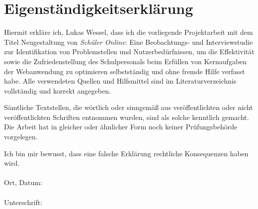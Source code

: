 \newpage
\section{Eigenständigkeitserklärung}
Hiermit erkläre ich, Lukas Wessel, dass ich die vorliegende Projektarbeit mit dem Titel \glqq Neugestaltung von \textit{Schüler Online}: Eine Beobachtungs- und Interviewstudie zur Identifikation von Problemstellen und Nutzerbedürfnissen, um die Effektivität sowie die Zufriedenstellung des Schulpersonals beim Erfüllen von Kernaufgaben der Webanwendung zu optimieren\grqq{} selbstständig und ohne fremde Hilfe verfasst habe. Alle verwendeten Quellen und Hilfsmittel sind im Literaturverzeichnis vollständig und korrekt angegeben.

Sämtliche Textstellen, die wörtlich oder sinngemäß aus veröffentlichten oder nicht veröffentlichten Schriften entnommen wurden, sind als solche kenntlich gemacht. Die Arbeit hat in gleicher oder ähnlicher Form noch keiner Prüfungsbehörde vorgelegen.

Ich bin mir bewusst, dass eine falsche Erklärung rechtliche Konsequenzen haben wird.
\\\\

Ort, Datum: 
\\\\

Unterschrift: 